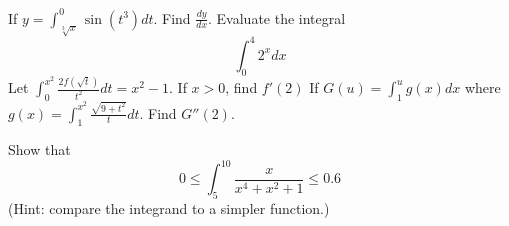 \documentclass[
  course = {{MATH102 Calculus II}},
  quartile = {{2}},
  assignment = {{Section: 5.3}}, %
  firstexercise = 1,
  term = 203
]{../class/aga-homework}
\begin{document}
\problem If $\displaystyle y = \int_{\sqrt[3]{x}}^{0} \sin(t^3)dt$. Find $\displaystyle \frac{dy}{dx}$.
\newpage
\problem Evaluate the integral
\[
\int_{0}^{4} 2^x dx
\]
\newpage
\problem Let $\displaystyle \int_{0}^{x^2}\frac{2f\left(\sqrt{t}\right)}{t^2} dt = x^2-1$. If $x>0$, find $f'(2)$
\newpage
\problem If $\displaystyle G(u) = \int_{1}^{u}g(x)dx$ where $\displaystyle g(x)=\int_{1}^{x^2}\frac{\sqrt{9+t^2}}{t}dt$. Find $G''(2)$.
\newpage

\problem[(Challenge)] Show that
\[
0\leq \int_{5}^{10}\frac{x}{x^4+x^2+1} \leq 0.6
\]
(Hint: compare the integrand to a simpler function.)
\end{document}
